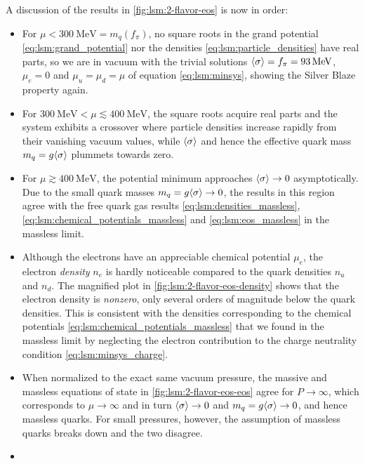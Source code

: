 A discussion of the results in \cref{fig:lsm:2-flavor-eos} is now in order:
\begin{itemize}
\item For $\mu < \SI{300}{\mega\electronvolt} = m_q(f_\pi)$, no square roots in the grand potential \eqref{eq:lsm:grand_potential} nor the densities \eqref{eq:lsm:particle_densities} have real parts, so we are in vacuum with the trivial solutions $\langle \sigma \rangle = f_\pi = \SI{93}{\mega\electronvolt}$, $\mu_e = 0$ and $\mu_u = \mu_d = \mu$ of equation \eqref{eq:lsm:minsys}, showing the Silver Blaze property again.
\item For $\SI{300}{\mega\electronvolt} < \mu \lesssim \SI{400}{\mega\electronvolt}$, the square roots acquire real parts and the system exhibits a crossover where particle densities increase rapidly from their vanishing vacuum values, while $\langle \sigma \rangle$ and hence the effective quark mass $m_q = g \langle \sigma \rangle$ plummets towards zero.
\item For $\mu \gtrsim \SI{400}{\mega\electronvolt}$, the potential minimum approaches $\langle \sigma \rangle \rightarrow 0$ asymptotically.
      Due to the small quark masses $m_q = g \langle \sigma \rangle \rightarrow 0$, the results in this region agree with the free quark gas results \eqref{eq:lsm:densities_massless}, \eqref{eq:lsm:chemical_potentials_massless} and \eqref{eq:lsm:eos_massless} in the massless limit.
\item Although the electrons have an appreciable chemical potential $\mu_e$, the electron \emph{density} $n_e$ is hardly noticeable compared to the quark densities $n_u$ and $n_d$.
      The magnified plot in \cref{fig:lsm:2-flavor-eos-density} shows that the electron density is \emph{nonzero}, only several orders of magnitude below the quark densities.
      This is consistent with the densities corresponding to the chemical potentials \eqref{eq:lsm:chemical_potentials_massless} that we found in the massless limit by neglecting the electron contribution to the charge neutrality condition \eqref{eq:lsm:minsys_charge}.
\item When normalized to the exact same vacuum pressure, the massive and massless equations of state in \cref{fig:lsm:2-flavor-eos-eos} agree for $P \rightarrow \infty$, which corresponds to $\mu \rightarrow \infty$ and in turn $\langle \sigma \rangle \rightarrow 0$ and $m_q = g \langle \sigma \rangle \rightarrow 0$, and hence massless quarks.
      For small pressures, however, the assumption of massless quarks breaks down and the two disagree.
\item {}
\end{itemize}

